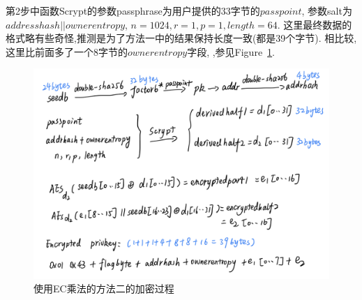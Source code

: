 第2步中函数Scrypt的参数passphrase为用户提供的33字节的$passpoint$, 
参数salt为$addresshash || ownerentropy$, $n=1024, r=1, p=1, length=64$.
这里最终数据的格式略有些奇怪,推测是为了方法一中的结果保持长度一致(都是39个字节).
相比较,这里比前面多了一个8字节的$ownerentropy$字段,
,参见Figure~\ref{fig-m2enc}.




\begin{figure}[h]
\centering
\includegraphics[width=.7\textwidth]{./ec.png}
\caption{使用EC乘法的方法二的加密过程}\label{fig-m2enc}
\end{figure}

